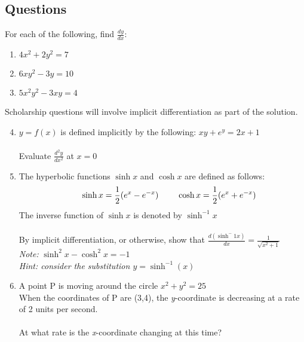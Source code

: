 \documentclass[../main.tex]{subfiles}
\begin{document}
\pagebreak

\subsection*{Questions}
\label{Implicit Differentiation}
For each of the following, find \(\frac{dy}{dx}\):
\begin{enumerate}
    \item \(4x^2 +2y^2 = 7\) \\
    \item \(6xy^2 - 3y=10\) \\
    \item \(5x^2y^2 -3xy=4\) \\
\end{enumerate}
Scholarship questions will involve implicit differentiation as part of the solution.
\begin{enumerate}
    \setcounter{enumi}{3}
    \item \(y=f(x)\) is defined implicitly by the following: \(xy+e^y=2x+1\)\\ \\
    Evaluate \( \frac{d^2y}{dx^2}\) at \(x=0\)\\
    \item The hyperbolic functions \(\sinh{x}\) and \(\cosh{x}\) are defined as follows:
    \begin{align*}
        &\hspace{0.5cm} \sinh{x}=\frac{1}{2}(e^x-e^{-x}) 
        &\hspace{0.5cm} \cosh{x}=\frac{1}{2}(e^x+e^{-x}) 
    \end{align*}    
    The inverse function of \(\sinh{x}\) is denoted by \(\sinh^{-1}{x}\)\\ \\
    By implicit differentiation, or otherwise, show that \( \frac{d(\sinh^-1x)}{dx}=\frac{1}{\sqrt{x^2+1}}\)\\
    \textit{Note:} \(\sinh^2{x}-\cosh^2{x}=-1\)\\
    \textit{Hint: consider the substitution \(y=\sinh^{-1}(x)\)}\\
    \item A point P is moving around the circle \(x^2+y^2=25\)\\
    When the coordinates of P are (3,4), the \textit{y}-coordinate is decreasing at a rate of 2 units per second.\\ \\
    At what rate is the \textit{x}-coordinate changing at this time?
\end{enumerate}

\pagebreak
\end{document}
